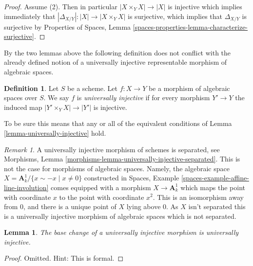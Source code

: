 \documentclass{stacks-project}
\theoremstyle{plain}
\newtheorem{lemma}[subsection]{Lemma}
\theoremstyle{definition}
\newtheorem{definition}[subsection]{Definition}
\theoremstyle{remark}
\newtheorem{remark}[subsection]{Remark}
\numberwithin{equation}{subsection}
\begin{document}
\begin{proof}
\medskip\noindent
Assume (2). Then in particular $|X \times_Y X| \to |X|$ is injective
which implies immediately that
$|\Delta_{X/Y}| : |X| \to |X \times_Y X|$ is surjective, which
implies that $\Delta_{X/Y}$ is surjective by
Properties of Spaces,
Lemma \ref{spaces-properties-lemma-characterize-surjective}.
\end{proof}

\noindent
By the two lemmas above the following definition does not conflict with
the already defined notion of a universally injective representable morphism
of algebraic spaces.

\begin{definition}
\label{definition-universally-injective}
Let $S$ be a scheme. Let $f : X \to Y$ be a morphism of algebraic
spaces over $S$. We say $f$ is {\it universally injective} if
for every morphism $Y' \to Y$ the induced map
$|Y' \times_Y X| \to |Y'|$ is injective.
\end{definition}

\noindent
To be sure this means that any or all of the equivalent conditions of
Lemma \ref{lemma-universally-injective}
hold.

\begin{remark}
\label{remark-universally-injective-not-separated}
A universally injective morphism of schemes is separated, see
Morphisms, Lemma
\ref{morphisms-lemma-universally-injective-separated}.
This is not the case for morphisms of algebraic spaces.
Namely, the algebraic space
$X = \mathbf{A}^1_k/\{x \sim -x \mid x \not = 0\}$
constructed in
Spaces, Example \ref{spaces-example-affine-line-involution}
comes equipped with a morphism $X \to \mathbf{A}^1_k$ which maps
the point with coordinate $x$ to the point with coordinate $x^2$.
This is an isomorphism away from $0$, and there is a unique point
of $X$ lying above $0$. As $X$ isn't separated this is a universally
injective morphism of algebraic spaces which is not separated.
\end{remark}

\begin{lemma}
\label{lemma-base-change-universally-injective}
The base change of a universally injective morphism is universally injective.
\end{lemma}

\begin{proof}
Omitted. Hint: This is formal.
\end{proof}
\end{document}
